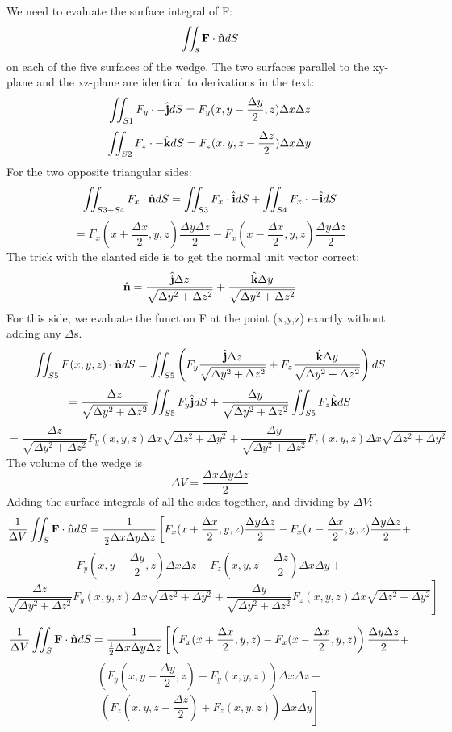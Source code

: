 \documentclass{article}
\begin{document}
\begin{enumerate}
    We need to evaluate the surface integral of F:
    \[ \iint_s \textbf{F} \cdot \hat{\textbf{n}} dS \]
    on each of the five surfaces of the wedge. The two surfaces parallel to the xy-plane
    and the xz-plane are identical to derivations in the text:
    \[ \iint_{S1} F_y \cdot -\hat{\textbf{j}} dS = F_y(x, y - \frac{\Delta y}{2}, z) \Delta x \Delta z \]
    \[ \iint_{S2} F_z \cdot -\hat{\textbf{k}} dS = F_z(x, y, z - \frac{\Delta z}{2}) \Delta x \Delta y \]
    For the two opposite triangular sides:
    \[ \iint_{S3 + S4} F_x \cdot \hat{\textbf{n}} dS = \iint_{S3} F_x \cdot \hat{\textbf{i}} dS + \iint_{S4} F_x \cdot -\hat{\textbf{i}} dS \]
    \[ = F_x(x + \frac{\Delta x}{2}, y, z) \frac{\Delta y \Delta z}{2} - F_x(x - \frac{\Delta x}{2}, y, z) \frac{\Delta y \Delta z}{2} \]
    The trick with the slanted side is to get the normal unit vector correct:
    \[ \hat{\textbf{n}} = \frac{\hat{\textbf{j}} \Delta z}{\sqrt{\Delta y^2 + \Delta z^2}} + \frac{\hat{\textbf{k}} \Delta y}{\sqrt{\Delta y^2 + \Delta z^2}} \]
    For this side, we evaluate the function F at the point (x,y,z) exactly without adding any $\Delta$s.
    \[ \iint_{S5} F(x,y,z) \cdot \hat{\textbf{n}} dS = \iint_{S5} \left( F_y \frac{\hat{\textbf{j}} \Delta z}{\sqrt{\Delta y^2 + \Delta z^2}} + F_z \frac{\hat{\textbf{k}} \Delta y}{\sqrt{\Delta y^2 + \Delta z^2}} \right) dS \]
    \[ = \frac{\Delta z}{\sqrt{\Delta y^2 + \Delta z^2}} \iint_{S5} F_y \hat{\textbf{j}} dS + \frac{\Delta y}{\sqrt{\Delta y^2 + \Delta z^2}} \iint_{S5} F_z \hat{\textbf{k}} dS \]
    \[ = \frac{\Delta z}{\sqrt{\Delta y^2 + \Delta z^2}} F_y(x,y,z) \Delta x \sqrt{\Delta z ^2 + \Delta y ^2}  + \frac{\Delta y}{\sqrt{\Delta y^2 + \Delta z^2}} F_z(x,y,z) \Delta x \sqrt{\Delta z ^2 + \Delta y ^2} \]
    The volume of the wedge is
    \[ \Delta V = \frac{\Delta x \Delta y \Delta z}{2}\]
    Adding the surface integrals of all the sides together, and dividing by $\Delta V$:
    \[ \frac{1}{\Delta V} \iint_S \textbf{F} \cdot \hat{\textbf{n}} dS = \frac{1}{\frac{1}{2} \Delta x \Delta y \Delta z} \left[ F_x(x + \frac{\Delta x}{2}, y, z) \frac{\Delta y \Delta z}{2} - F_x(x - \frac{\Delta x}{2}, y, z) \frac{\Delta y \Delta z}{2} + \right. \]
    \[ \left. F_y(x, y - \frac{\Delta y}{2}, z) \Delta x \Delta z + F_z(x, y, z - \frac{\Delta z}{2}) \Delta x \Delta y  + \right. \]
    \[ \left. \frac{\Delta z}{\sqrt{\Delta y^2 + \Delta z^2}}F_y(x,y,z) \Delta x \sqrt{\Delta z ^2 + \Delta y ^2}  + \frac{\Delta y}{\sqrt{\Delta y^2 + \Delta z^2}} F_z(x,y,z) \Delta x \sqrt{\Delta z ^2 + \Delta y ^2} \right] \]

    \[ \frac{1}{\Delta V} \iint_S \textbf{F} \cdot \hat{\textbf{n}} dS = \frac{1}{\frac{1}{2} \Delta x \Delta y \Delta z} \left[ \left( F_x(x + \frac{\Delta x}{2}, y, z) - F_x(x - \frac{\Delta x}{2}, y, z) \right) \frac{\Delta y \Delta z}{2} + \right. \]
    \[ \left. \left( F_y(x, y - \frac{\Delta y}{2}, z) + F_y(x,y,z) \right) \Delta x \Delta z + \right. \]
    \[ \left. \left( F_z(x, y, z - \frac{\Delta z}{2}) + F_z(x,y,z) \right) \Delta x \Delta y \right] \]


\end{enumerate}
\end{document}
